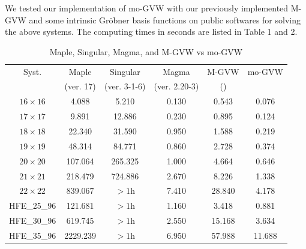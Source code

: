 \documentclass[final, number, 3p,12pt]{elsarticle}
\begin{document}
We tested our implementation of mo-GVW with our previously implemented M-GVW \citep{SunDW14} and some intrinsic Gr\"obner basis functions on public softwares for solving the above systems. 
The computing times in seconds are listed in Table 1 and 2.

{
\begin{table}[H]\centering
\medskip
\begin{tabular}{c c c c c c}
\hline
Syst. & Maple & Singular & Magma & M-GVW & mo-GVW\\

& (ver. 17) & (ver. 3-1-6) & (ver. 2.20-3) & (\citep{SunDW14}) & \\ \hline

$16 \times 16$ & 4.088 & 5.210 & 0.130 & 0.543 & 0.076 \\

$17 \times 17$ & 9.891 & 12.886 & 0.230 & 0.895 & 0.124 \\

$18 \times 18$ & 22.340 & 31.590 & 0.950 & 1.588 & 0.219 \\

$19 \times 19$ & 48.314 & 84.771 & 0.860 & 2.728 & 0.374 \\

$20 \times 20$ & 107.064 & 265.325 & 1.000 & 4.664 & 0.646 \\

$21 \times 21$ & 218.479 & 724.886 & 2.670 & 8.226 &1.338 \\

$22 \times 22$ & 839.067 & $>1$h & 7.410 & 28.840 & 4.178 \\

HFE\_25\_96 & 121.681 & $>1$h & 1.160 & 3.418 & 0.881 \\

HFE\_30\_96 & 619.745 & $>1$h & 2.550 & 15.168 & 3.634 \\

HFE\_35\_96 & 2229.239 & $>1$h & 6.950 & 57.988 & 11.688 \\

\hline
\end{tabular}\\
\caption{\small  Maple, Singular, Magma, and M-GVW vs mo-GVW}
\end{table}
}
\end{document}
